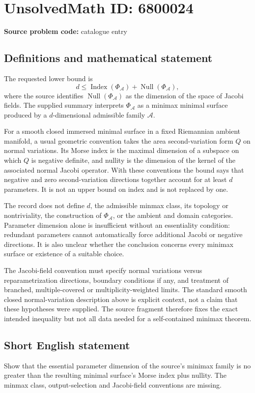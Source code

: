 \documentclass[11pt]{article}
\begin{document}
\section*{UnsolvedMath ID: 6800024}
\textbf{Source problem code:} catalogue entry
\subsection{Definitions and mathematical statement}
The requested lower bound is
\[
d\leq\operatorname{Index}(\Phi_{\mathcal A})+\operatorname{Null}(\Phi_{\mathcal A}),
\]
where the source identifies $\operatorname{Null}(\Phi_{\mathcal A})$ as the dimension of the space of Jacobi fields. The supplied summary interprets $\Phi_{\mathcal A}$ as a minimax minimal surface produced by a $d$-dimensional admissible family $\mathcal A$.

For a smooth closed immersed minimal surface in a fixed Riemannian ambient manifold, a usual geometric convention takes the area second-variation form $Q$ on normal variations. Its Morse index is the maximal dimension of a subspace on which $Q$ is negative definite, and nullity is the dimension of the kernel of the associated normal Jacobi operator. With these conventions the bound says that negative and zero second-variation directions together account for at least $d$ parameters. It is not an upper bound on index and is not replaced by one.

The record does not define $d$, the admissible minmax class, its topology or nontriviality, the construction of $\Phi_{\mathcal A}$, or the ambient and domain categories. Parameter dimension alone is insufficient without an essentiality condition: redundant parameters cannot automatically force additional Jacobi or negative directions. It is also unclear whether the conclusion concerns every minimax surface or existence of a suitable choice.

The Jacobi-field convention must specify normal variations versus reparametrization directions, boundary conditions if any, and treatment of branched, multiple-covered or multiplicity-weighted limits. The standard smooth closed normal-variation description above is explicit context, not a claim that these hypotheses were supplied. The source fragment therefore fixes the exact intended inequality but not all data needed for a self-contained minimax theorem.
\subsection{Short English statement}
Show that the essential parameter dimension of the source's minimax family is no greater than the resulting minimal surface's Morse index plus nullity. The minmax class, output-selection and Jacobi-field conventions are missing.
\end{document}
